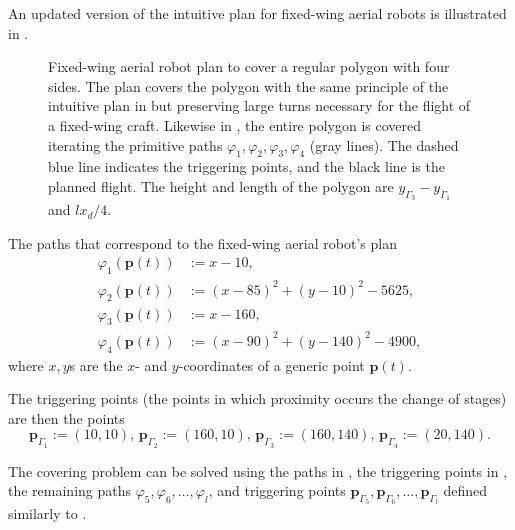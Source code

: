 An updated version of the intuitive plan for fixed-wing aerial robots is illustrated in .

\begin{figure}[p!]
  \centering
  
  \caption[Fixed-wing aerial robot's plan to cover a regular polygon with four sides]{Fixed-wing aerial robot plan to cover a regular polygon with four sides. The plan covers the polygon with the same principle of the intuitive plan in  but preserving large turns necessary for the flight of a fixed-wing craft. Likewise in , the entire polygon is covered iterating the primitive paths $\varphi_1,\varphi_2,\varphi_3,\varphi_4$ (gray lines). The dashed blue line indicates the triggering points, and the black line is the planned flight. The height and length of the polygon are $y_{\Gamma_3}-y_{\Gamma_1}$ and $lx_d/4$.}
  \label{fig:plot4}
\end{figure}

The paths that correspond to the fixed-wing aerial robot's plan 
\begin{subequations}\label{eq:basic-plan}\begin{align}
\varphi_1(\mathbf{p}(t))&:=x-10,\label{eq:line1}\\
\varphi_2(\mathbf{p}(t))&:=(x-85)^2+(y-10)^2-5625,\label{eq:circ1}\\
\varphi_3(\mathbf{p}(t))&:=x-160,\label{eq:line2}\\
\varphi_4(\mathbf{p}(t))&:=(x-90)^2+(y-140)^2-4900,\label{eq:circ2}\end{align}
\end{subequations}
where $x,y$s are the $x$- and $y$-coordinates of a generic point $\mathbf{p}(t)$. 

The triggering points (the points in which proximity occurs the change of stages) are then the points
\begin{equation}\label{eq:basic-plan-trigs}
  \mathbf{p}_{\Gamma_1}:=(10,10),\,\mathbf{p}_{\Gamma_2}:=(160,10),\,\mathbf{p}_{\Gamma_3}:=(160,140),\,\mathbf{p}_{\Gamma_4}:=(20,140).
\end{equation}

The covering problem can be solved using the paths in , the triggering points in , the remaining paths $\varphi_5,\varphi_6,\dots,\varphi_l$, and triggering points $\mathbf{p}_{\Gamma_5},\mathbf{p}_{\Gamma_6},\dots,\mathbf{p}_{\Gamma_l}$ defined similarly to .

